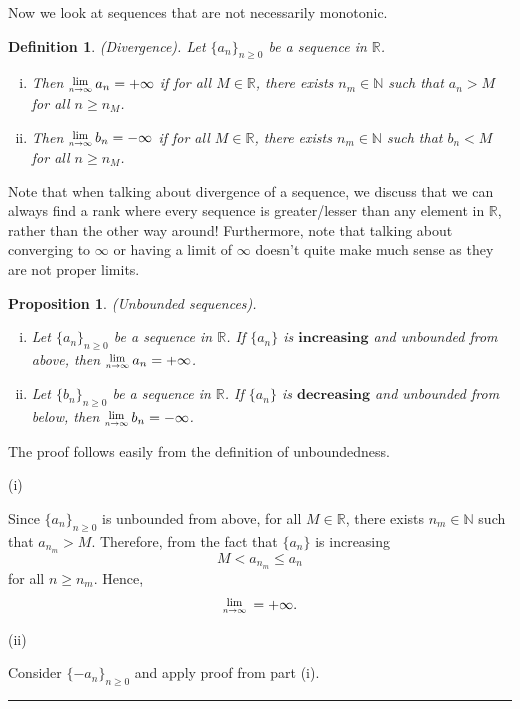 \documentclass[twoside]{article}
\newcommand{\Lim}[1]{\raisebox{0.5ex}{\scalebox{0.8}{$\displaystyle \lim_{#1}\;$}}}
\newtheorem{proposition}[theorem]{Proposition}
\newtheorem{definition}[theorem]{Definition}
\newenvironment{proof}{{\bf Proof:}}{\hfill\rule{2mm}{2mm}}
\begin{document}
\bigskip
Now we look at sequences that are not necessarily monotonic.

\begin{definition}
(Divergence). Let $\{a_n\}_{n \geq 0}$ be a sequence in $\mathbb{R}$.
\begin{enumerate}[(i)]
  \item Then $\Lim{n \rightarrow \infty}a_n = +\infty$ if for all $M \in \mathbb{R}$, there exists $n_m \in \mathbb{N}$ such that $a_n > M$ for all $n \geq n_M$.
  \item Then $\Lim{n \rightarrow \infty}b_n = -\infty$ if for all $M \in \mathbb{R}$, there exists $n_m \in \mathbb{N}$ such that $b_n < M$ for all $n \geq n_M$.
\end{enumerate}
\end{definition}

Note that when talking about divergence of a sequence, we discuss that we can always find a rank where every sequence is greater/lesser than any element in $\mathbb{R}$, rather than the other way around! Furthermore, note that talking about converging to $\infty$ or having a limit of $\infty$ doesn't quite make much sense as they are not proper limits.

\begin{proposition} (Unbounded sequences).
\begin{enumerate}[(i)]
\item Let $\{a_n\}_{n \geq 0}$ be a sequence in $\mathbb{R}$. If $\{a_n\}$ is $\textbf{increasing}$ and unbounded from above, then $\Lim{n \rightarrow \infty}a_n = +\infty$.
\item Let $\{b_n\}_{n \geq 0}$ be a sequence in $\mathbb{R}$. If $\{a_n\}$ is $\textbf{decreasing}$ and unbounded from below, then $\Lim{n \rightarrow \infty}b_n = -\infty$.
\end{enumerate}
\end{proposition}

\begin{proof} The proof follows easily from the definition of unboundedness.

(i)

Since $\{a_n\}_{n \geq 0}$ is unbounded from above, for all $M \in \mathbb{R}$, there exists $n_m \in \mathbb{N}$ such that $a_{n_m} > M$. Therefore, from the fact that $\{a_n\}$ is increasing
$$
M < a_{n_m} \leq a_n
$$
for all $n \geq n_m$. Hence, 
$$
\Lim{n \rightarrow \infty} = +\infty.
$$

(ii)

Consider $\{-a_n\}_{n \geq 0}$ and apply proof from part (i).
\end{proof}
\end{document}
